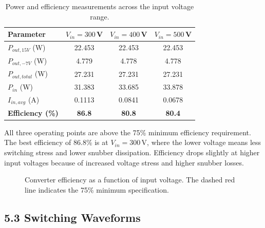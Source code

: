 \begin{table}[H]
\centering
\caption{Power and efficiency measurements across the input voltage range.}
\label{tab:power}
\begin{tabular}{lccc}
\toprule
\textbf{Parameter} & \textbf{$V_{in}=300$\,V} & \textbf{$V_{in}=400$\,V} & \textbf{$V_{in}=500$\,V} \\
\midrule
$P_{out,15V}$ (W) & 22.453 & 22.453 & 22.453 \\
$P_{out,-7V}$ (W) & 4.779 & 4.778 & 4.778 \\
$P_{out,total}$ (W) & 27.231 & 27.231 & 27.231 \\
$P_{in}$ (W) & 31.383 & 33.685 & 33.878 \\
$I_{in,avg}$ (A) & 0.1113 & 0.0841 & 0.0678 \\
\midrule
\textbf{Efficiency (\%)} & \textbf{86.8} & \textbf{80.8} & \textbf{80.4} \\
\bottomrule
\end{tabular}
\end{table}

All three operating points are above the 75\% minimum efficiency requirement. The best efficiency of 86.8\% is at $V_{in} = 300$\,V, where the lower voltage means less switching stress and lower snubber dissipation. Efficiency drops slightly at higher input voltages because of increased voltage stress and higher snubber losses.

\begin{figure}[H]
\centering
{}
\caption{Converter efficiency as a function of input voltage. The dashed red line indicates the 75\% minimum specification.}
\label{fig:eff}
\end{figure}

\subsection*{5.3 Switching Waveforms}

